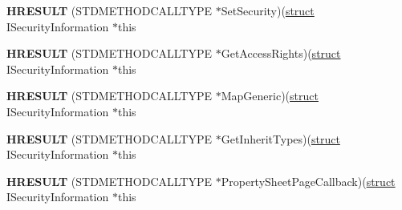 \begin{DoxyCompactItemize}
\item 
\mbox{\label{structiface_i_security_information_vbtl_a89779083edd769c5cf994daf73cca1f5}} 
{\bfseries H\+R\+E\+S\+U\+LT} (S\+T\+D\+M\+E\+T\+H\+O\+D\+C\+A\+L\+L\+T\+Y\+PE $\ast$Set\+Security)(\hyperlink{interfacestruct}{struct} I\+Security\+Information $\ast$this
\item 
\mbox{\label{structiface_i_security_information_vbtl_adfe2b93cb54fd45ef1a62f764d4c869d}} 
{\bfseries H\+R\+E\+S\+U\+LT} (S\+T\+D\+M\+E\+T\+H\+O\+D\+C\+A\+L\+L\+T\+Y\+PE $\ast$Get\+Access\+Rights)(\hyperlink{interfacestruct}{struct} I\+Security\+Information $\ast$this
\item 
\mbox{\label{structiface_i_security_information_vbtl_a3c81865b49d404765547e9bf27219d52}} 
{\bfseries H\+R\+E\+S\+U\+LT} (S\+T\+D\+M\+E\+T\+H\+O\+D\+C\+A\+L\+L\+T\+Y\+PE $\ast$Map\+Generic)(\hyperlink{interfacestruct}{struct} I\+Security\+Information $\ast$this
\item 
\mbox{\label{structiface_i_security_information_vbtl_aed2f3fca7c937e1dbf1f6ca7fcf502d3}} 
{\bfseries H\+R\+E\+S\+U\+LT} (S\+T\+D\+M\+E\+T\+H\+O\+D\+C\+A\+L\+L\+T\+Y\+PE $\ast$Get\+Inherit\+Types)(\hyperlink{interfacestruct}{struct} I\+Security\+Information $\ast$this
\item 
\mbox{\label{structiface_i_security_information_vbtl_aa0c0800a8762077a24f5a347dcab97d2}} 
{\bfseries H\+R\+E\+S\+U\+LT} (S\+T\+D\+M\+E\+T\+H\+O\+D\+C\+A\+L\+L\+T\+Y\+PE $\ast$Property\+Sheet\+Page\+Callback)(\hyperlink{interfacestruct}{struct} I\+Security\+Information $\ast$this
\end{DoxyCompactItemize}
